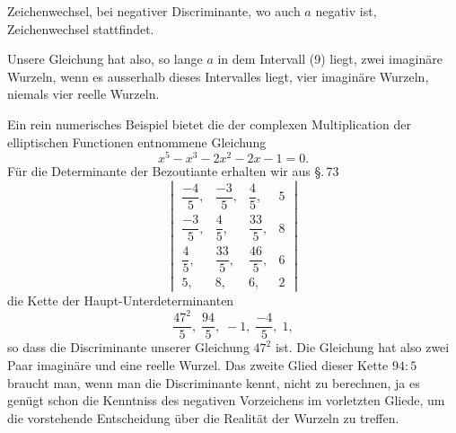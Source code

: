 Zeichenwechsel, bei negativer Discriminante, wo auch $a$ negativ ist,  Zeichenwechsel stattfindet.

Unsere Gleichung hat also, so lange $a$ in dem Intervall (9) liegt, zwei imaginäre Wurzeln, wenn es ausserhalb dieses Intervalles liegt, vier imaginäre Wurzeln, niemals vier reelle Wurzeln.

Ein rein numerisches Beispiel bietet die der complexen Multiplication der elliptischen Functionen entnommene Gleichung
\[
x^5 - x^3 - 2x^2 - 2x - 1 = 0.
\]
Für die Determinante der Bezoutiante erhalten wir aus \S.\,73
\[
\begin{vmatrix}
\dfrac{-4}{5}, & \dfrac{-3}{5}, & \dfrac{4}{5}, & 5 \\[6pt]
\dfrac{-3}{5}, & \dfrac{4}{5}, & \dfrac{33}{5}, & 8 \\[6pt]
\dfrac{4}{5}, & \dfrac{33}{5}, & \dfrac{46}{5}, & 6 \\[6pt]
5, & 8, & 6, & 2
\end{vmatrix}
\]
die Kette der Haupt-Unterdeterminanten
\[
\frac{47^2}{5}, \; \frac{94}{5}, \; -1, \; \frac{-4}{5}, \; 1,
\]
so dass die Discriminante unserer Gleichung $47^2$ ist. Die Gleichung hat also zwei Paar imaginäre und eine reelle Wurzel. Das zweite Glied dieser Kette $94 : 5$ braucht man, wenn man die Discriminante kennt, nicht zu berechnen, ja es genügt schon die Kenntniss des negativen Vorzeichens im vorletzten Gliede, um die vorstehende Entscheidung über die Realität der Wurzeln zu treffen.
